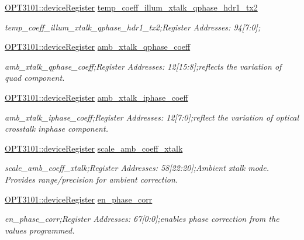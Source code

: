 \begin{DoxyCompactItemize}
\mbox{\hyperlink{class_o_p_t3101_1_1device_register}{O\+P\+T3101\+::device\+Register}} \mbox{\hyperlink{class_o_p_t3101_1_1registers_a3ce19350fe264d7d75766a2acc679925}{temp\+\_\+coeff\+\_\+illum\+\_\+xtalk\+\_\+qphase\+\_\+hdr1\+\_\+tx2}}
\begin{DoxyCompactList}\small\item\em temp\+\_\+coeff\+\_\+illum\+\_\+xtalk\+\_\+qphase\+\_\+hdr1\+\_\+tx2;Register Addresses\+: 94\mbox{[}7\+:0\mbox{]}; \end{DoxyCompactList}\item 
\mbox{\hyperlink{class_o_p_t3101_1_1device_register}{O\+P\+T3101\+::device\+Register}} \mbox{\hyperlink{class_o_p_t3101_1_1registers_a3dce7bd901ac52a70ba9830dbf010e5f}{amb\+\_\+xtalk\+\_\+qphase\+\_\+coeff}}
\begin{DoxyCompactList}\small\item\em amb\+\_\+xtalk\+\_\+qphase\+\_\+coeff;Register Addresses\+: 12\mbox{[}15\+:8\mbox{]};reflects the variation of quad component. \end{DoxyCompactList}\item 
\mbox{\hyperlink{class_o_p_t3101_1_1device_register}{O\+P\+T3101\+::device\+Register}} \mbox{\hyperlink{class_o_p_t3101_1_1registers_a14655b9b47629fcc2a1240b9c6abec0d}{amb\+\_\+xtalk\+\_\+iphase\+\_\+coeff}}
\begin{DoxyCompactList}\small\item\em amb\+\_\+xtalk\+\_\+iphase\+\_\+coeff;Register Addresses\+: 12\mbox{[}7\+:0\mbox{]};reflect the variation of optical crosstalk inphase component. \end{DoxyCompactList}\item 
\mbox{\hyperlink{class_o_p_t3101_1_1device_register}{O\+P\+T3101\+::device\+Register}} \mbox{\hyperlink{class_o_p_t3101_1_1registers_ac4a29475ab04f87654c275469b3611c8}{scale\+\_\+amb\+\_\+coeff\+\_\+xtalk}}
\begin{DoxyCompactList}\small\item\em scale\+\_\+amb\+\_\+coeff\+\_\+xtalk;Register Addresses\+: 58\mbox{[}22\+:20\mbox{]};Ambient xtalk mode. Provides range/precision for ambient correction. \end{DoxyCompactList}\item 
\mbox{\hyperlink{class_o_p_t3101_1_1device_register}{O\+P\+T3101\+::device\+Register}} \mbox{\hyperlink{class_o_p_t3101_1_1registers_a66984616af1af7f24eaf7226e8d64c11}{en\+\_\+phase\+\_\+corr}}
\begin{DoxyCompactList}\small\item\em en\+\_\+phase\+\_\+corr;Register Addresses\+: 67\mbox{[}0\+:0\mbox{]};enables phase correction from the values programmed. \end{DoxyCompactList}\item 

\end{DoxyCompactItemize}
